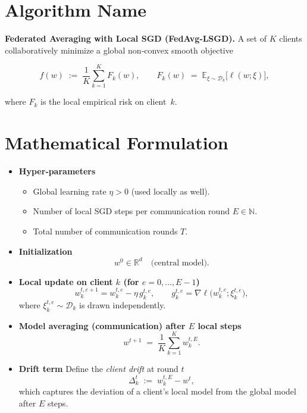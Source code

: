 \documentclass{article}
\begin{document}
\section*{Algorithm Name}
\textbf{Federated Averaging with Local SGD (FedAvg‑LSGD).}  
A set of $K$ clients collaboratively minimize a global non‑convex smooth objective  

\[
f(w)\;:=\;\frac{1}{K}\sum_{k=1}^{K}F_k(w),\qquad 
F_k(w)\;=\;\mathbb{E}_{\xi\sim\mathcal{D}_k}\big[\ell(w;\xi)\big],
\]

where $F_k$ is the local empirical risk on client~$k$.

\section*{Mathematical Formulation}
\begin{itemize}
    \item \textbf{Hyper‑parameters}
    \begin{itemize}
        \item Global learning rate $\eta>0$ (used locally as well).
        \item Number of local SGD steps per communication round $E\in\mathbb{N}$.
        \item Total number of communication rounds $T$.
    \end{itemize}
    \item \textbf{Initialization}
    \[
    w^{0}\in\mathbb{R}^{d}\quad\text{(central model).}
    \]
    \item \textbf{Local update on client $k$ (for $e=0,\dots,E-1$)}
    \[
    w^{t,e+1}_{k}=w^{t,e}_{k}-\eta\, g^{t,e}_{k},
    \qquad 
    g^{t,e}_{k}= \nabla \ell\big(w^{t,e}_{k};\xi^{t,e}_{k}\big),
    \]
    where $\xi^{t,e}_{k}\sim\mathcal{D}_k$ is drawn independently.
    \item \textbf{Model averaging (communication) after $E$ local steps}
    \[
    w^{t+1}\;=\;\frac{1}{K}\sum_{k=1}^{K} w^{t,E}_{k}.
    \]
    \item \textbf{Drift term}
    Define the \emph{client drift} at round $t$
    \[
    \Delta^{t}_{k}\;:=\;w^{t,E}_{k}-w^{t},
    \]
    which captures the deviation of a client’s local model from the global model after $E$ steps.
\end{itemize}
\end{document}
